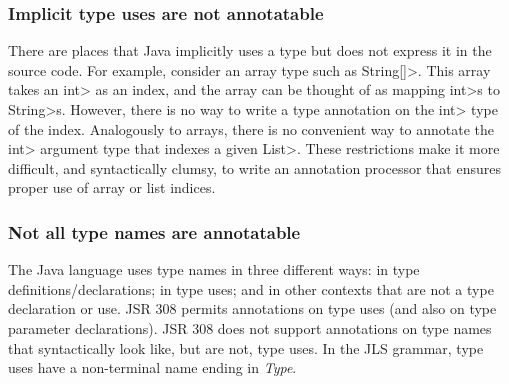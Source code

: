 \documentclass[10pt]{article}
\begin{document}


% 
% 
% 


\subsubsection{Implicit type uses are not annotatable\label{implicit-type-uses}}

There are places that Java implicitly uses a type but does not express it
in the source code.  For example, consider an array type such as
\<String[]>.  This array takes an \<int> as an index, and the array can be
thought of as mapping \<int>s to \<String>s.  However, there is no way to
write a type annotation on the \<int> type of the index.  Analogously to
arrays, there is no convenient way to annotate the \<int> argument type
that indexes a given \<List>.  These restrictions make it more difficult,
and syntactically clumsy, to write an annotation processor that ensures
proper use of array or list indices.


\subsubsection{Not all type names are annotatable\label{type-names}}

The Java language uses type names in three different ways:  in type
definitions/declarations; in type uses; and in other contexts that are not
a type declaration or use.  JSR 308 permits annotations on type uses (and
also on type parameter declarations).  JSR 308 does not support annotations
on type names that syntactically look like, but are not, type uses.
In the JLS grammar, type uses have a non-terminal name ending in
\emph{Type}.
\end{document}

